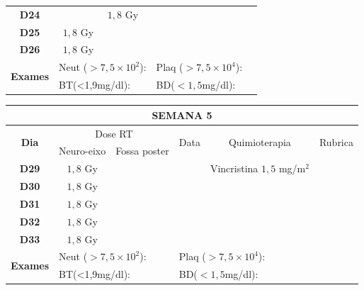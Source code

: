 \documentclass[11pt,a4paper,oldfontcommands]{memoir}
\begin{document}
\begin{center}
\begin{longtable}{p{1cm}p{2cm}|p{2cm}|p{1cm}|p{4cm}|p{3cm}}
    \multicolumn{1}{c|}{\multirow{1}{*}{\textbf{D24}}}&\multicolumn{1}{c|}{}&{\(1,8\) Gy}&&{}&\\
    \multicolumn{1}{c|}{\multirow{1}{*}{\textbf{D25}}}&\multicolumn{1}{c|}{\(1,8\) Gy}&&&{}&\\
    \multicolumn{1}{c|}{\multirow{1}{*}{\textbf{D26}}}&\multicolumn{1}{c|}{\(1,8\) Gy}&&&{}&\\
    \hline
    \multicolumn{1}{c|}{\multirow{2}{*}{\textbf{Exames}}}&\multicolumn{2}{l|}{Neut (\(>7,5\times10^2\)):}&\multicolumn{2}{l|}{Plaq (\(>7,5\times10^4\)):}&\\
    \cline{2-6}
    \multicolumn{1}{c|}{\multirow{2}{*}{{}}}&\multicolumn{2}{l|}{BT(<1,9mg/dl):}&\multicolumn{2}{l|}{BD(\(<1,5\)mg/dl):}&
    \\
    \hline
\end{longtable}
\clearpage
\begin{longtable}{p{1cm}p{2cm}|p{2cm}|p{1cm}|p{4cm}|p{3cm}}
	\hline
	\multicolumn{6}{c}{\textbf{SEMANA 5}}\\
\hline
    \multicolumn{1}{c|}{\multirow{2}{*}{\textbf{Dia}}}&\multicolumn{2}{c|}{Dose RT}&\multicolumn{1}{c|}{\multirow{2}{*}{Data}}&\multicolumn{1}{c|}{\multirow{2}{*}{Quimioterapia}}&\multicolumn{1}{c}{\multirow{2}{*}{Rubrica}} \\
    \cline{2-3}
    \multicolumn{1}{c|}{\multirow{1}{*}{}}&{Neuro-eixo}&{Fossa poster}&& \\
	\hline
	\multicolumn{1}{c|}{\multirow{1}{*}{\textbf{D29}}}&\multicolumn{1}{c|}{\(1,8\) Gy}&&&{Vincristina \(1,5\) mg/m\(^2\)}&\\
    \multicolumn{1}{c|}{\multirow{1}{*}{\textbf{D30}}}&\multicolumn{1}{c|}{\(1,8\) Gy}&&&{}&\\
    \multicolumn{1}{c|}{\multirow{1}{*}{\textbf{D31}}}&\multicolumn{1}{c|}{\(1,8\) Gy}&&&{}&\\
    \multicolumn{1}{c|}{\multirow{1}{*}{\textbf{D32}}}&\multicolumn{1}{c|}{\(1,8\) Gy}&&&{}&\\
    \multicolumn{1}{c|}{\multirow{1}{*}{\textbf{D33}}}&\multicolumn{1}{c|}{\(1,8\) Gy}&&&{}&\\
    \hline
    \multicolumn{1}{c|}{\multirow{2}{*}{\textbf{Exames}}}&\multicolumn{2}{l|}{Neut (\(>7,5\times10^2\)):}&\multicolumn{2}{l|}{Plaq (\(>7,5\times10^4\)):}&\\
    \cline{2-6}
    \multicolumn{1}{c|}{\multirow{2}{*}{{}}}&\multicolumn{2}{l|}{BT(<1,9mg/dl):}&\multicolumn{2}{l|}{BD(\(<1,5\)mg/dl):}&
    \\
    \hline
\end{longtable}


\end{center}
\end{document}
